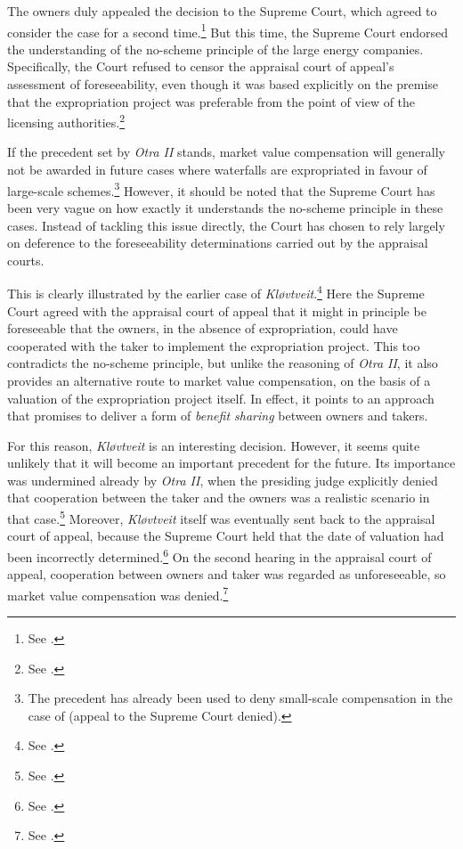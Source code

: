 The owners duly appealed the decision to the Supreme Court, which agreed to consider the case for a second time.\footnote{See \cite{otra13}.} But this time, the Supreme Court endorsed the understanding of the no-scheme principle of the large energy companies. Specifically, the Court refused to censor the appraisal court of appeal's assessment of foreseeability, even though it was based explicitly on the premise that the expropriation project was preferable from the point of view of the licensing authorities.\footnote{See \cite[53-54]{otra13}.}

If the precedent set by {\it Otra II} stands, market value compensation will generally not be awarded in future cases where waterfalls are expropriated in favour of large-scale schemes.\footnote{The precedent has already been used to deny small-scale compensation in the case of \cite{smibelg15} (appeal to the Supreme Court denied).} However, it should be noted that the Supreme Court has been very vague on how exactly it understands the no-scheme principle in these cases. Instead of tackling this issue directly, the Court has chosen to rely largely on deference to the foreseeability determinations carried out by the appraisal courts.

This is clearly illustrated by the earlier case of {\it Kløvtveit}.\footnote{See \cite{klovtveit11}.} Here the Supreme Court agreed with the appraisal court of appeal that it might in principle be foreseeable that the owners, in the absence of expropriation, could have cooperated with the taker to implement the expropriation project. This too contradicts the no-scheme principle, but unlike the reasoning of {\it Otra II}, it also provides an alternative route to market value compensation, on the basis of a valuation of the expropriation project itself. In effect, it points to an approach that promises to deliver a form of {\it benefit sharing} between owners and takers. 

For this reason, {\it Kløvtveit} is an interesting decision. However, it seems quite unlikely that it will become an important precedent for the future. Its importance was undermined already by {\it Otra II}, when the presiding judge explicitly denied that cooperation between the taker and the owners was a realistic scenario in that case.\footnote{See \cite[69-71]{otra13}.} Moreover, {\it Kløvtveit} itself was eventually sent back to the appraisal court of appeal, because the Supreme Court held that the date of valuation had been incorrectly determined.\footnote{See \cite[35-39]{klovtveit11}.} On the second hearing in the appraisal court of appeal, cooperation between owners and taker was regarded as unforeseeable, so market value compensation was denied.\footnote{See \cite{klovtveit13}.}

